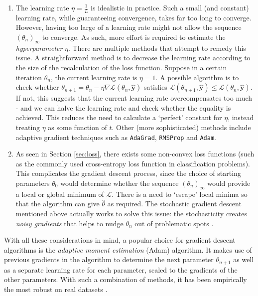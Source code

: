\documentclass[a4paper,11pt,titlepage]{article}
\theoremstyle{definition}
\theoremstyle{plain}
\theoremstyle{remark}
\begin{document}
\begin{enumerate}
    \item The learning rate $\eta = \frac{1}{L}$ is idealistic in practice. Such a small (and constant) learning rate, while guaranteeing convergence, takes far too long to converge. However, having too large of a learning rate might not allow the sequence $(\theta_n)_\infty$ to converge. As such, more effort is required to estimate the \textit{hyperparameter} $\eta$. There are multiple methods that attempt to remedy this issue. A straightforward method is to decrease the learning rate according to the size of the recalculation of the loss function. Suppose in a certain iteration $\theta_n$, the current learning rate is $\eta = 1$. A possible algorithm is to check whether $\theta_{n+1} = \theta_n - \eta \nabla\mathcal{L}(\theta_n, \mathbf{\hat{y}})$ satisfies $\mathcal{L}(\theta_{n+1}, \mathbf{\hat{y}}) \leq \mathcal{L}(\theta_n, \mathbf{\hat{y}})$. If not, this suggests that the current learning rate overcompensates too much - and we can halve the learning rate and check whether the equality is achieved. This reduces the need to calculate a ‘perfect’ constant for $\eta$, instead treating $\eta$ as some function of $t$. Other (more sophisticated) methods include adaptive gradient techniques such as \texttt{AdaGrad}, \texttt{RMSProp} and \texttt{Adam}.

    \item As seen in Section \ref{sec:loss}, there exists some non-convex loss functions (such as the commonly used cross-entropy loss function in classification problems). This complicates the gradient descent process, since the choice of starting parameters $\theta_0$ would determine whether the sequence $(\theta_n)_\infty$ would provide a local or global minimum of $\mathcal{L}$. There is a need to ‘escape’ local minima so that the algorithm can give $\hat{\theta}$ as required. The stochastic gradient descent mentioned above actually works to solve this issue: the stochasticity creates \textit{noisy gradients} that helps to nudge $\theta_n$ out of problematic spots \cite{nazarathy2021}.
\end{enumerate}

With all these considerations in mind, a popular choice for gradient descent algorithms is the \textit{adaptive moment estimation} (Adam) algorithm. It makes use of previous gradients in the algorithm to determine the next parameter $\theta_{n+1}$ as well as a separate learning rate for each parameter, scaled to the gradients of the other parameters. With such a combination of methods, it has been empirically the most robust on real datasets \cite{nazarathy2021}.
\end{document}
